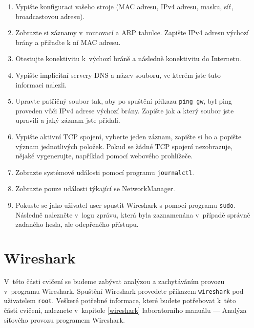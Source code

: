\begin{enumerate}
\item Vypište konfiguraci vašeho stroje (MAC adresu, IPv4 adresu, masku, síť, broadcastovou adresu).
\item Zobrazte si záznamy v~routovací a ARP tabulce. Zapište IPv4 adresu výchozí brány a přiřaďte k ní MAC adresu.
\item Otestujte konektivitu k~výchozí bráně a následně konektivitu do Internetu.
\item Vypište implicitní servery DNS a název souboru, ve kterém jste tuto informaci nalezli.
\item Upravte patřičný soubor tak, aby po spuštění příkazu \texttt{ping gw}, byl ping proveden vůči IPv4 adrese výchozí brány. Zapište jak a který soubor jste upravili a jaký záznam jste přidali.
\item Vypište aktivní TCP spojení, vyberte jeden záznam, zapište si ho a popište význam jednotlivých položek. Pokud se žádné TCP spojení nezobrazuje, nějaké vygenerujte, například pomocí webového prohlížeče.
\item Zobrazte systémové události pomocí programu \texttt{journalctl}.
\item Zobrazte pouze události týkající se NetworkManager.
\item Pokuste se jako uživatel user spustit Wireshark s pomocí programu \texttt{sudo}. Následně nalezněte v~logu zprávu, která byla zaznamenána v~případě správně zadaného hesla, ale odepřeného přístupu.
\end{enumerate}

\section{Wireshark}
V~této části cvičení se budeme zabývat analýzou a zachytáváním provozu
v~programu Wireshark. Spuštění Wireshark provedete příkazem \texttt{wireshark}
pod uživatelem \texttt{root}. Veškeré potřebné informace, které budete
potřebovat k~této části cvičení, naleznete v~kapitole \ref{wireshark} laboratorního manuálu
--- Analýza síťového provozu programem Wireshark.

